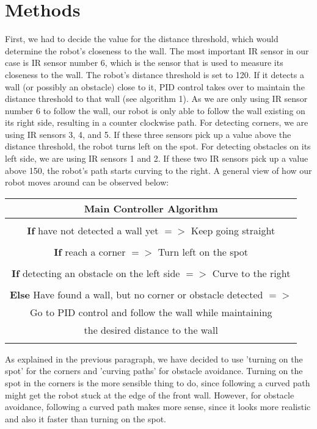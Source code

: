 \documentclass[]{article}
\begin{document}
\section{Methods}
First, we had to decide the value for the distance threshold, which would determine the robot's closeness to the wall. The most important IR sensor in our case is IR sensor number 6, which is the sensor that is used to measure its closeness to the wall. The robot's distance threshold is set to 120. If it detects a wall (or possibly an obstacle) close to it, PID control takes over to maintain the distance threshold to that wall (see algorithm 1). As we are only using IR sensor number 6 to follow the wall, our robot is only able to follow the wall existing on its right side, resulting in a counter clockwise path. For detecting corners, we are using IR sensors 3, 4, and 5. If these three sensors pick up a value above the distance threshold, the robot turns left on the spot. For detecting obstacles on its left side, we are using IR sensors 1 and 2. If these two IR sensors pick up a value above 150, the robot's path starts curving to the right. A general view of how our robot moves around can be observed below: 

\begin{center}
\begin{tabular}{ |c| } 
 \hline
 \textbf{Main Controller Algorithm} \\
 \hline
 \\
 \textbf{If} have not detected a wall yet $=>$ Keep going straight \\ \\
 \textbf{If} reach a corner $=>$ Turn left on the spot \\ \\
 \textbf{If} detecting an obstacle on the left side $=>$ Curve to the right \\ \\
 \textbf{Else} Have found a wall, but no corner or obstacle detected $=>$ \\ Go to PID control and follow the wall while maintaining \\ the desired distance to the wall \\ \\
 \hline
\end{tabular}
\end{center}
As explained in the previous paragraph, we have decided to use 'turning on the spot' for the corners and 'curving paths' for obstacle avoidance. Turning on the spot in the corners is the more sensible thing to do, since following a curved path might get the robot stuck at the edge of the front wall. However, for obstacle avoidance, following a curved path makes more sense, since it looks more realistic and also it faster than turning on the spot. \\
\end{document}
